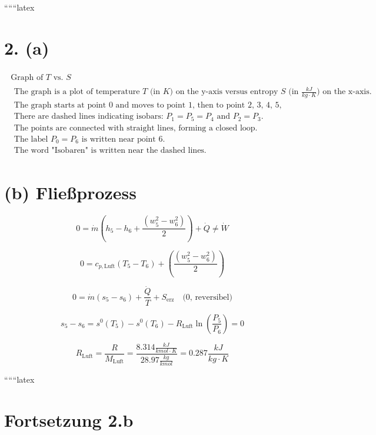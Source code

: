 
``````latex


\section*{2. (a)}

\[
\begin{array}{c}
\begin{array}{c|c}
\text{Graph of } T \text{ vs. } S & \\
\hline
\begin{array}{c}
\text{The graph is a plot of temperature } T \text{ (in } K \text{) on the y-axis versus entropy } S \text{ (in } \frac{kJ}{kg \cdot K} \text{) on the x-axis.} \\
\text{The graph starts at point 0 and moves to point 1, then to point 2, 3, 4, 5, and finally to point 6.} \\
\text{There are dashed lines indicating isobars: } P_1 = P_5 = P_4 \text{ and } P_2 = P_3. \\
\text{The points are connected with straight lines, forming a closed loop.} \\
\text{The label } P_0 = P_6 \text{ is written near point 6.} \\
\text{The word "Isobaren" is written near the dashed lines.}
\end{array}
\end{array}
\end{array}
\]

\section*{(b) Fließprozess}

\[
0 = \dot{m} \left( h_5 - h_6 + \frac{(w_5^2 - w_6^2)}{2} \right) + \dot{Q} \neq \dot{W}
\]

\[
0 = c_{p,\text{Luft}} (T_5 - T_6) + \left( \frac{(w_5^2 - w_6^2)}{2} \right)
\]

\[
0 = \dot{m} (s_5 - s_6) + \frac{\dot{Q}}{T} + S_{\text{erz}} \quad \text{(0, reversibel)}
\]

\[
s_5 - s_6 = s^0 (T_5) - s^0 (T_6) - R_{\text{Luft}} \ln \left( \frac{P_5}{P_6} \right) = 0
\]

\[
R_{\text{Luft}} = \frac{R}{M_{\text{Luft}}} = \frac{8.314 \frac{kJ}{kmol \cdot K}}{28.97 \frac{kg}{kmol}} = 0.287 \frac{kJ}{kg \cdot K}
\]

``````latex

\section*{Fortsetzung 2.b}

